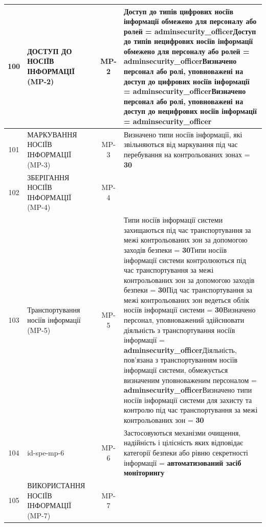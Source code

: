 \documentclass[10pt]{article}
\begin{document}
\begin{longtable}{|c|>{\raggedright\arraybackslash}p{2.5cm}|>{\raggedright\arraybackslash}p{4.5cm}|c|>{\raggedright\arraybackslash}p{4.5cm}|}
100 & ДОСТУП ДО НОСІЇВ ІНФОРМАЦІЇ (MP-2) &  & MP-2 & Доступ до типів цифрових носіїв інформації обмежено для персоналу або ролей = \textbf{adminsecurity\_\allowbreak{}officer}\newline Доступ до типів нецифрових носіїв інформації обмежено для персоналу або ролей = \textbf{adminsecurity\_\allowbreak{}officer}\newline Визначено персонал або ролі, уповноважені на доступ до цифрових носіїв інформації = \textbf{adminsecurity\_\allowbreak{}officer}\newline Визначено персонал або ролі, уповноважені на доступ до нецифрових носіїв інформації = \textbf{adminsecurity\_\allowbreak{}officer} \\ \hline
101 & МАРКУВАННЯ НОСІЇВ ІНФОРМАЦІЇ (MP-3) &  & MP-3 & Визначено типи носіїв інформації, які звільняються від маркування під час перебування на контрольованих зонах = \textbf{30} \\ \hline
102 & ЗБЕРІГАННЯ НОСІЇВ ІНФОРМАЦІЇ (MP-4) &  & MP-4 &  \\ \hline
103 & Транспортування носіїв інформації (MP-5) &  & MP-5 & Типи носіїв інформації системи захищаються під час транспортування за межі контрольованих зон за допомогою заходів безпеки = \textbf{30}\newline Типи носіїв інформації системи контролюються під час транспортування за межі контрольованих зон за допомогою заходів безпеки = \textbf{30}\newline Під час транспортування за межі контрольованих зон ведеться облік носіїв інформації системи = \textbf{30}\newline Визначено персонал, уповноважений здійснювати діяльність з транспортування носіїв інформації = \textbf{adminsecurity\_\allowbreak{}officer}\newline Діяльність, пов'язана з транспортуванням носіїв інформації системи, обмежується визначеним уповноваженим персоналом = \textbf{adminsecurity\_\allowbreak{}officer}\newline Визначено типи носіїв інформації системи для захисту та контролю під час транспортування за межі контрольованих зон = \textbf{30} \\ \hline
104 & id-spe-mp-6 &  & MP-6 & Застосовуються механізми очищення, надійність і цілісність яких відповідає категорії безпеки або рівню секретності інформації = \textbf{автоматизований засіб моніторингу} \\ \hline
105 & ВИКОРИСТАННЯ НОСІЇВ ІНФОРМАЦІЇ (MP-7) &  & MP-7 &  \\ \hline

\end{longtable}
\end{document}
